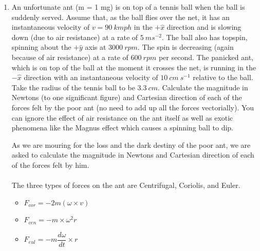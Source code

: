 \documentclass[fleqn]{article}
\begin{document}
\begin{enumerate}
    \item An unfortunate ant (m = 1 mg) is on top of a tennis ball when the ball is suddenly served. Assume that, as the ball flies over the net,
    it has an instantaneous velocity of $v=90 ~ kmph$ in the $+\hat{x}$ direction and is slowing down (due to air resistance) at a rate of
    $5 ~ ms^{-2}$. The ball also has topspin, spinning about the $+\hat{y}$ axis at $3000 ~ rpm$. The spin is decreasing (again because of air resistance) at a rate of
    $600 ~ rpm$ per second. The panicked ant, which is on top of the ball at the moment it crosses the net, is running in the $-\hat{x}$ direction with an
    instantaneous velocity of $10 ~ cm ~ s^{-1}$ relative to the ball. Take the radius of the tennis ball to be $3.3 ~ cm$. Calculate the magnitude in Newtons
    (to one significant figure) and Cartesian direction of each of the forces felt by the poor ant (no need to add up all the forces vectorially). You
    can ignore the effect of air resistance on the ant itself as well as exotic phenomena like the Magnus effect which causes a spinning ball to dip.

      \textcolor{hwColor}{
        As we are mouring for the loss and the dark destiny of the poor ant, we are asked to 
        calculate the magnitude in Newtons and Cartesian direction of each of the forces felt 
        by him. \\
        \\
        The three types of forces on the ant are Centrifugal, Coriolis, and Euler. 
        \begin{itemize}
          \item $F_{cor}=-2m \left(\omega \times v\right)$
          \item $F_{cen}=-m \times \omega^2 r$
          \item $F_{eul}=-m \dfrac{d \omega}{dt} \times r$
        \end{itemize}
      }


\end{enumerate}
\end{document}
